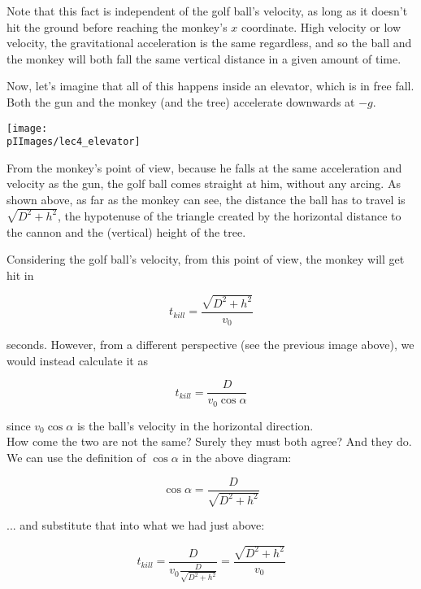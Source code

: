 Note that this fact is independent of the golf ball's velocity, as long as it doesn't hit the ground before reaching the monkey's $x$ coordinate. High velocity or low velocity, the gravitational acceleration is the same regardless, and so the ball and the monkey will both fall the same vertical distance in a given amount of time.

Now, let's imagine that all of this happens inside an elevator, which is in free fall. Both the gun and the monkey (and the tree) accelerate downwards at $-g$.

\begin{center}
\texttt{[image: \\pIImages/lec4\_elevator]}
\end{center}

From the monkey's point of view, because he falls at the same acceleration and velocity as the gun, the golf ball comes straight at him, without any arcing. As shown above, as far as the monkey can see, the distance the ball has to travel is $\sqrt{D^2 + h^2}$, the hypotenuse of the triangle created by the horizontal distance to the cannon and the (vertical) height of the tree.

Considering the golf ball's velocity, from this point of view, the monkey will get hit in

\begin{equation}
t_{kill} = \frac{\sqrt{D^2 + h^2}}{v_0}
\end{equation}

seconds. However, from a different perspective (see the previous image above), we would instead calculate it as

\begin{equation}
t_{kill} = \frac{D}{v_0 \cos \alpha}
\end{equation}

since $v_0 \cos \alpha$ is the ball's velocity in the horizontal direction.\\
How come the two are not the same? Surely they must both agree? And they do. We can use the definition of $\cos \alpha$ in the above diagram:

\begin{equation}
\cos \alpha = \frac{D}{\sqrt{D^2 + h^2}}
\end{equation}

... and substitute that into what we had just above:

\begin{equation}
t_{kill} = \frac{D}{v_0 \frac{D}{\sqrt{D^2 + h^2}}} = \frac{\sqrt{D^2 + h^2}}{v_0} 
\end{equation}

